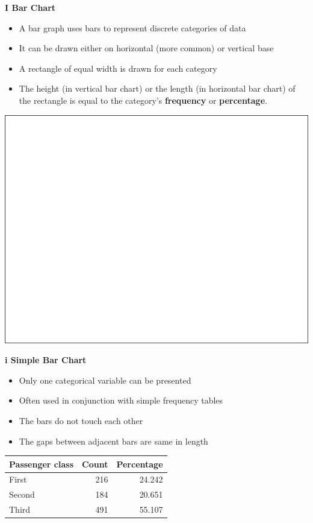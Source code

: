 \documentclass[]{book}
\providecommand{\tightlist}{%
  \setlength{\itemsep}{0pt}\setlength{\parskip}{0pt}}
\begin{document}
\textbf{I Bar Chart}

\begin{itemize}
\tightlist
\item
  A bar graph uses bars to represent discrete categories of data
\item
  It can be drawn either on horizontal (more common) or vertical base
\item
  A rectangle of equal width is drawn for each category
\item
  The height (in vertical bar chart) or the length (in horizontal bar chart) of the rectangle is equal to the category's \textbf{frequency} or \textbf{percentage}.
\end{itemize}

\begin{center}\includegraphics[width=1\linewidth]{figure/box6-1} \end{center}

\textbf{i Simple Bar Chart}

\begin{itemize}
\tightlist
\item
  Only one categorical variable can be presented
\item
  Often used in conjunction with simple frequency tables
\item
  The bars do not touch each other
\item
  The gaps between adjacent bars are same in length
\end{itemize}

\begin{tabular}{l|r|r}
\hline
Passenger class & Count & Percentage\\
\hline
First & 216 & 24.242\\
\hline
Second & 184 & 20.651\\
\hline
Third & 491 & 55.107\\
\hline
\end{tabular}
\end{document}
